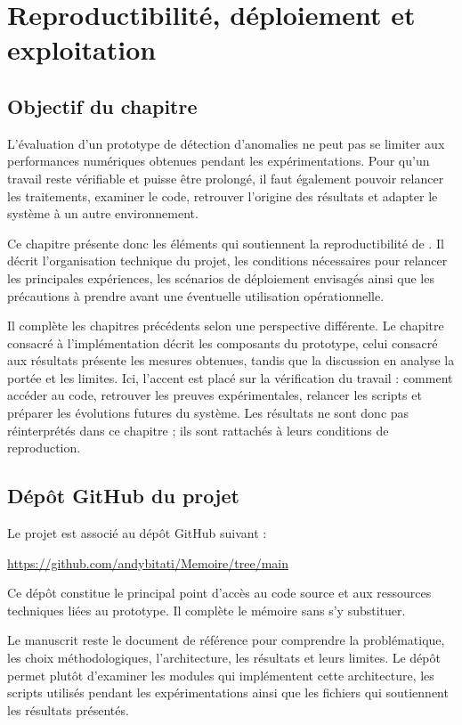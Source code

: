 \chapter{Reproductibilité, déploiement et exploitation}

\section{Objectif du chapitre}

L'évaluation d'un prototype de détection d'anomalies ne peut pas se limiter aux performances numériques obtenues pendant les expérimentations. Pour qu'un travail reste vérifiable et puisse être prolongé, il faut également pouvoir relancer les traitements, examiner le code, retrouver l'origine des résultats et adapter le système à un autre environnement.

Ce chapitre présente donc les éléments qui soutiennent la reproductibilité de \logminer{}. Il décrit l'organisation technique du projet, les conditions nécessaires pour relancer les principales expériences, les scénarios de déploiement envisagés ainsi que les précautions à prendre avant une éventuelle utilisation opérationnelle.

Il complète les chapitres précédents selon une perspective différente. Le chapitre consacré à l'implémentation décrit les composants du prototype, celui consacré aux résultats présente les mesures obtenues, tandis que la discussion en analyse la portée et les limites. Ici, l'accent est placé sur la vérification du travail : comment accéder au code, retrouver les preuves expérimentales, relancer les scripts et préparer les évolutions futures du système. Les résultats ne sont donc pas réinterprétés dans ce chapitre ; ils sont rattachés à leurs conditions de reproduction.

\section{Dépôt GitHub du projet}

Le projet est associé au dépôt GitHub suivant :

\begin{center}
\url{https://github.com/andybitati/Memoire/tree/main}
\end{center}

Ce dépôt constitue le principal point d'accès au code source et aux ressources techniques liées au prototype. Il complète le mémoire sans s'y substituer.

Le manuscrit reste le document de référence pour comprendre la problématique, les choix méthodologiques, l'architecture, les résultats et leurs limites. Le dépôt permet plutôt d'examiner les modules qui implémentent cette architecture, les scripts utilisés pendant les expérimentations ainsi que les fichiers qui soutiennent les résultats présentés.

